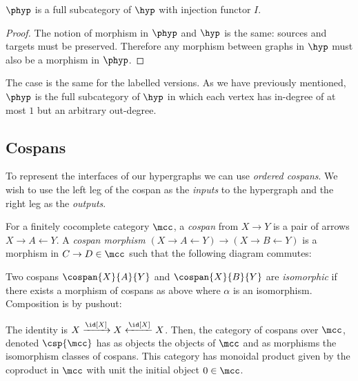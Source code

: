 \documentclass[10pt]{article}
\begin{document}
\begin{proposition}
    $\phyp$ is a full subcategory of $\hyp$ with injection functor $I$.
\end{proposition}
\begin{proof}
    The notion of morphism in $\phyp$ and $\hyp$ is the same: sources and targets must be preserved.
    Therefore any morphism between graphs in $\hyp$ must also be a morphism in $\phyp$.
\end{proof}

The case is the same for the labelled versions.
As we have previously mentioned, $\phyp$ is the full subcategory of $\hyp$ in which each vertex has in-degree of at most $1$ but an arbitrary out-degree.

\subsection{Cospans}

To represent the interfaces of our hypergraphs we can use \emph{ordered cospans}.
We wish to use the left leg of the cospan as the \emph{inputs} to the hypergraph and the right leg as the \emph{outputs}.

\begin{definition}\label{def:cospans}
    For a finitely cocomplete category $\mcc$, a \emph{cospan} from $X \to Y$ is a pair of arrows $X \to A \leftarrow Y$.
    A \emph{cospan morphism} $(X \to A \leftarrow Y) \to (X \to B \leftarrow Y)$ is a morphism in $C \to D \in \mcc$ such that the following diagram commutes: 
    
    \begin{center}
        
    \end{center}
    
    Two cospans $\cospan{X}{A}{Y}$ and $\cospan{X}{B}{Y}$ are \emph{isomorphic} if there exists a morphism of cospans as above where $\alpha$ is an isomorphism.
    Composition is by pushout:

    \begin{center}
        
    \end{center}

    The identity is $X \xrightarrow{\id[X]} X \xleftarrow{\id[X]} X$.
    Then, the category of cospans over $\mcc$, denoted $\csp{\mcc}$ has as objects the objects of $\mcc$ and as morphisms the isomorphism classes of cospans.
    This category has monoidal product given by the coproduct in $\mcc$ with unit the initial object $0 \in \mcc$.
\end{definition}
\end{document}
